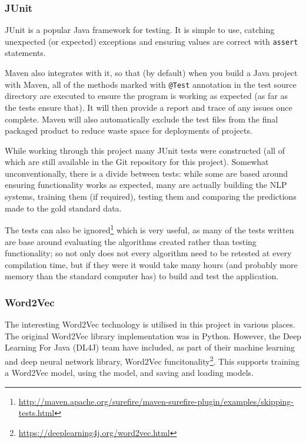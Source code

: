 \subsubsection*{JUnit}
JUnit is a popular Java framework for testing. It is simple to use, catching unexpected (or expected) exceptions and ensuring values are correct with \texttt{assert} statements. 

Maven also integrates with it, so that (by default) when you build a Java project with Maven, all of the methods marked with \texttt{@Test} annotation in the test source directory are executed to ensure the program is working as expected (as far as the tests ensure that). It will then provide a report and trace of any issues once complete. Maven will also automatically exclude the test files from the final packaged product to reduce waste space for deployments of projects. 

While working through this project many JUnit tests were constructed (all of which are still available in the Git repository for this project). Somewhat unconventionally, there is a divide between tests: while some are based around ensuring functionality works as expected, many are actually building the NLP systems, training them (if required), testing them and comparing the predictions made to the gold standard data.

The tests can also be ignored\footnote{\href{http://maven.apache.org/surefire/maven-surefire-plugin/examples/skipping-tests.html}{http://maven.apache.org/surefire/maven-surefire-plugin/examples/skipping-tests.html}} which is very useful, as many of the tests written are base around evaluating the algorithms created rather than testing functionality; so not only does not every algorithm need to be retested at every compilation time, but if they were it would take many hours (and probably more memory than the standard computer has) to build and test the application. 

\subsubsection*{Word2Vec}
The interesting Word2Vec technology is utilised in this project in various places. The original Word2Vec library implementation was in Python. However, the Deep Learning For Java (DL4J) team have included, as part of their machine learning and deep neural network library, Word2Vec funcitonality\footnote{\href{https://deeplearning4j.org/word2vec.html}{https://deeplearning4j.org/word2vec.html}}. This supports training a Word2Vec model, using the model, and saving and loading models. 

